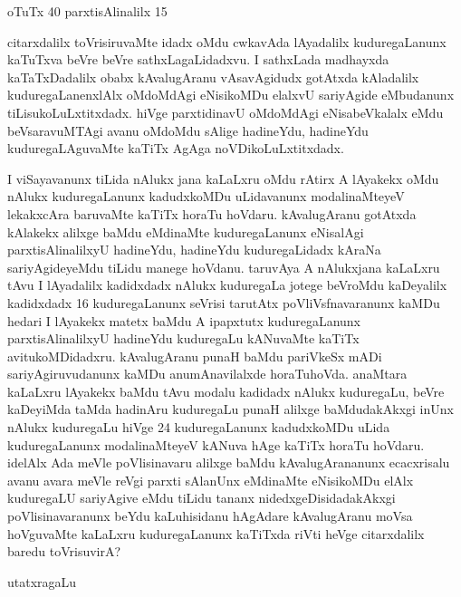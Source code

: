 \begin{enumerate}[\rm 1)]
\hspace{0.5cm}
oTuTx {\rm 40} parxtisAlinalilx {\rm 15} 

citarxdalilx toVrisiruvaMte idadx oMdu cwkavAda lAyadalilx kuduregaLanunx kaTuTxva beVre beVre sathxLagaLidadxvu. I sathxLada madhayxda kaTaTxDadalilx obabx kAvalugAranu vAsavAgidudx gotAtxda kAladalilx kuduregaLanenxlAlx oMdoMdAgi eNisikoMDu elalxvU sariyAgide eMbudanunx tiLisukoLuLxtitxdadx. hiVge parxtidinavU oMdoMdAgi eNisabeVkalalx eMdu beVsaravuMTAgi avanu oMdoMdu sAlige hadineYdu, hadineYdu kuduregaLAguvaMte kaTiTx AgAga noVDikoLuLxtitxdadx.

I viSayavanunx tiLida nAlukx jana kaLaLxru oMdu rAtirx A lAyakekx oMdu nAlukx kuduregaLanunx kadudxkoMDu uLidavanunx modalinaMteyeV lekakxcAra baruvaMte kaTiTx horaTu hoVdaru. kAvalugAranu gotAtxda kAlakekx alilxge baMdu eMdinaMte kuduregaLanunx eNisalAgi parxtisAlinalilxyU hadineYdu, hadineYdu kuduregaLidadx kAraNa sariyAgideyeMdu tiLidu manege hoVdanu. taruvAya A nAlukxjana kaLaLxru tAvu I lAyadalilx kadidxdadx nAlukx kuduregaLa jotege beVroMdu kaDeyalilx kadidxdadx {\rm 16} kuduregaLanunx seVrisi tarutAtx poVliVsfnavaranunx kaMDu hedari I lAyakekx matetx baMdu A ipapxtutx kuduregaLanunx parxtisAlinalilxyU hadineYdu kuduregaLu kANuvaMte kaTiTx avitukoMDidadxru. kAvalugAranu punaH baMdu pariVkeSx mADi sariyAgiruvudanunx kaMDu anumAnavilalxde horaTuhoVda. anaMtara kaLaLxru lAyakekx baMdu tAvu modalu kadidadx nAlukx kuduregaLu, beVre kaDeyiMda taMda hadinAru kuduregaLu punaH alilxge baMdudakAkxgi inUnx nAlukx kuduregaLu hiVge {\rm 24} kuduregaLanunx kadudxkoMDu uLida kuduregaLanunx modalinaMteyeV kANuva hAge kaTiTx horaTu hoVdaru. idelAlx Ada meVle poVlisinavaru alilxge baMdu kAvalugArananunx ecacxrisalu avanu avara meVle reVgi parxti sAlanUnx eMdinaMte eNisikoMDu elAlx kuduregaLU sariyAgive eMdu tiLidu tananx nidedxgeDisidadakAkxgi poVlisinavaranunx beYdu kaLuhisidanu hAgAdare kAvalugAranu moVsa hoVguvaMte kaLaLxru kuduregaLanunx kaTiTxda riVti heVge citarxdalilx baredu toVrisuvirA?
\begin{center}
utatxragaLu


\end{center}
\end{enumerate}
